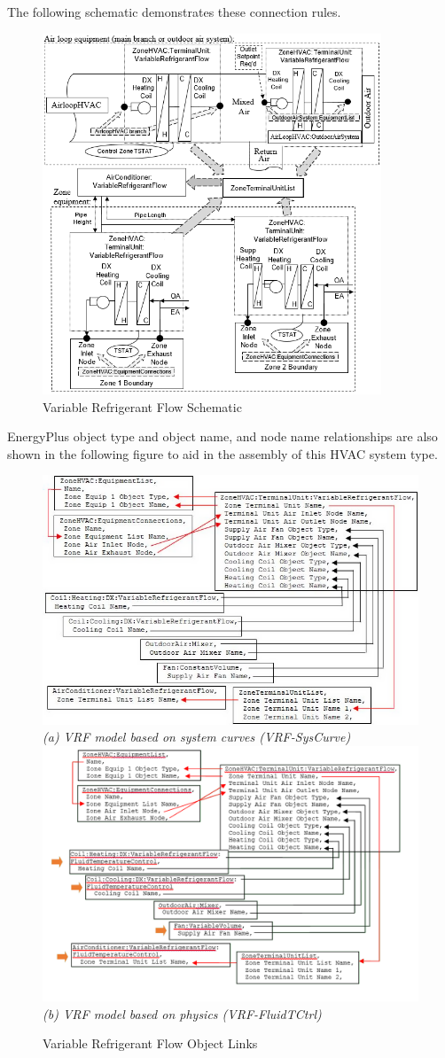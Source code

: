The following schematic demonstrates these connection rules.

\begin{figure}[hbtp] %
\centering
\includegraphics[width=0.9\textwidth, height=0.9\textheight, keepaspectratio=true]{media/image310.png}
\caption{Variable Refrigerant Flow Schematic \protect \label{fig:variable-refrigerant-flow-schematic}}
\end{figure}

EnergyPlus object type and object name, and node name relationships are also shown in the following figure to aid in the assembly of this HVAC system type.

\begin{figure}[hbtp]
\centering
\includegraphics[width=0.5\linewidth]{media/image311.png}
\emph{(a) VRF model based on system curves (VRF-SysCurve)}
\includegraphics[width=0.5\linewidth]{media/image312.png}
\emph{(b) VRF model based on physics (VRF-FluidTCtrl)}
\caption{Variable Refrigerant Flow Object Links \protect \label{fig:variable-refrigerant-flow-object-links}}
\end{figure}

